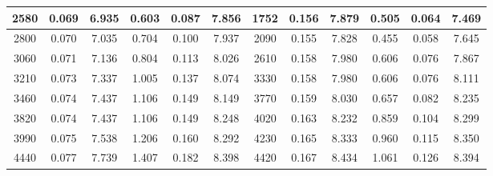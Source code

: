 \begin{table*}[]
\begin{tabular}{|cccccc|cccccc|}
        \multicolumn{1}{|c|}{2580} & \multicolumn{1}{c|}{0.069} & \multicolumn{1}{c|}{6.935} & \multicolumn{1}{c|}{0.603} & \multicolumn{1}{c|}{0.087} & 7.856 & \multicolumn{1}{c|}{1752} & \multicolumn{1}{c|}{0.156} & \multicolumn{1}{c|}{7.879} & \multicolumn{1}{c|}{0.505} & \multicolumn{1}{c|}{0.064} & 7.469 \\ \hline
        \multicolumn{1}{|c|}{2800} & \multicolumn{1}{c|}{0.070} & \multicolumn{1}{c|}{7.035} & \multicolumn{1}{c|}{0.704} & \multicolumn{1}{c|}{0.100} & 7.937 & \multicolumn{1}{c|}{2090} & \multicolumn{1}{c|}{0.155} & \multicolumn{1}{c|}{7.828} & \multicolumn{1}{c|}{0.455} & \multicolumn{1}{c|}{0.058} & 7.645 \\ \hline
        \multicolumn{1}{|c|}{3060} & \multicolumn{1}{c|}{0.071} & \multicolumn{1}{c|}{7.136} & \multicolumn{1}{c|}{0.804} & \multicolumn{1}{c|}{0.113} & 8.026 & \multicolumn{1}{c|}{2610} & \multicolumn{1}{c|}{0.158} & \multicolumn{1}{c|}{7.980} & \multicolumn{1}{c|}{0.606} & \multicolumn{1}{c|}{0.076} & 7.867 \\ \hline
        \multicolumn{1}{|c|}{3210} & \multicolumn{1}{c|}{0.073} & \multicolumn{1}{c|}{7.337} & \multicolumn{1}{c|}{1.005} & \multicolumn{1}{c|}{0.137} & 8.074 & \multicolumn{1}{c|}{3330} & \multicolumn{1}{c|}{0.158} & \multicolumn{1}{c|}{7.980} & \multicolumn{1}{c|}{0.606} & \multicolumn{1}{c|}{0.076} & 8.111 \\ \hline
        \multicolumn{1}{|c|}{3460} & \multicolumn{1}{c|}{0.074} & \multicolumn{1}{c|}{7.437} & \multicolumn{1}{c|}{1.106} & \multicolumn{1}{c|}{0.149} & 8.149 & \multicolumn{1}{c|}{3770} & \multicolumn{1}{c|}{0.159} & \multicolumn{1}{c|}{8.030} & \multicolumn{1}{c|}{0.657} & \multicolumn{1}{c|}{0.082} & 8.235 \\ \hline
        \multicolumn{1}{|c|}{3820} & \multicolumn{1}{c|}{0.074} & \multicolumn{1}{c|}{7.437} & \multicolumn{1}{c|}{1.106} & \multicolumn{1}{c|}{0.149} & 8.248 & \multicolumn{1}{c|}{4020} & \multicolumn{1}{c|}{0.163} & \multicolumn{1}{c|}{8.232} & \multicolumn{1}{c|}{0.859} & \multicolumn{1}{c|}{0.104} & 8.299 \\ \hline
        \multicolumn{1}{|c|}{3990} & \multicolumn{1}{c|}{0.075} & \multicolumn{1}{c|}{7.538} & \multicolumn{1}{c|}{1.206} & \multicolumn{1}{c|}{0.160} & 8.292 & \multicolumn{1}{c|}{4230} & \multicolumn{1}{c|}{0.165} & \multicolumn{1}{c|}{8.333} & \multicolumn{1}{c|}{0.960} & \multicolumn{1}{c|}{0.115} & 8.350 \\ \hline
        \multicolumn{1}{|c|}{4440} & \multicolumn{1}{c|}{0.077} & \multicolumn{1}{c|}{7.739} & \multicolumn{1}{c|}{1.407} & \multicolumn{1}{c|}{0.182} & 8.398 & \multicolumn{1}{c|}{4420} & \multicolumn{1}{c|}{0.167} & \multicolumn{1}{c|}{8.434} & \multicolumn{1}{c|}{1.061} & \multicolumn{1}{c|}{0.126} & 8.394 \\ \hline

\end{tabular}
\end{table*}
